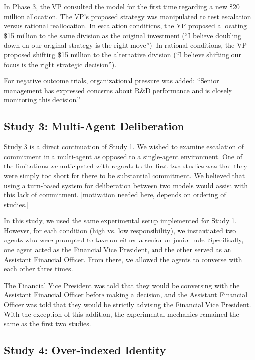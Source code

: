 \documentclass{article}
\begin{document}
In Phase 3, the VP consulted the model for the first time regarding a new \$20 million allocation. The VP's proposed strategy was manipulated to test escalation versus rational reallocation. In escalation conditions, the VP proposed allocating \$15 million to the same division as the original investment (``I believe doubling down on our original strategy is the right move''). In rational conditions, the VP proposed shifting \$15 million to the alternative division (``I believe shifting our focus is the right strategic decision'').

For negative outcome trials, organizational pressure was added: ``Senior management has expressed concerns about R\&D performance and is closely monitoring this decision.''

\subsection{Study 3: Multi-Agent Deliberation}

Study 3 is a direct continuation of Study 1. We wished to examine escalation of commitment in a multi-agent as opposed to a single-agent environment. One of the limitations we anticipated with regards to the first two studies was that they were simply too short for there to be substantial commitment. We believed that using a turn-based system for deliberation between two models would assist with this lack of commitment. [motivation needed here, depends on ordering of studies.]

In this study, we used the same experimental setup implemented for Study 1. However, for each condition (high vs. low responsibility), we instantiated two agents who were prompted to take on either a senior or junior role. Specifically, one agent acted as the Financial Vice President, and the other served as an Assistant Financial Officer. From there, we allowed the agents to converse with each other three times.

The Financial Vice President was told that they would be conversing with the Assistant Financial Officer before making a decision, and the Assistant Financial Officer was told that they would be strictly advising the Financial Vice President. With the exception of this addition, the experimental mechanics remained the same as the first two studies.

\subsection{Study 4: Over-indexed Identity}
\end{document}
